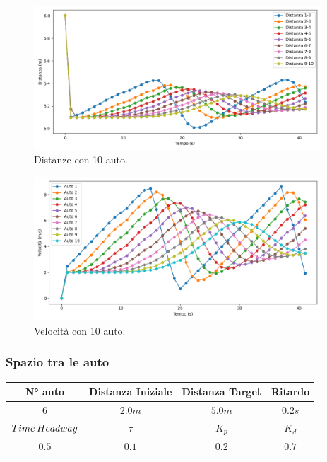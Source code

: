 \begin{figure}[H]
    \includegraphics[width=0.96\textwidth]{images/5-experiment/car-number/distance_10.png}
    \caption{Distanze con 10 auto.}
    \label{fig:10-cars-distance}
\end{figure}

\begin{figure}[H]
    \includegraphics[width=0.96\textwidth]{images/5-experiment/car-number/velocity_10.png}
    \caption{Velocità con 10 auto.}
    \label{fig:10-cars-velocity}
\end{figure}

\vspace*{\fill}
\newpage


\subsubsection{Spazio tra le auto}
\vspace*{\fill}
\begin{table}[h]
    \centering
    \begin{tabular}{|c|c|c|c|}
        \hline
        N° auto & Distanza Iniziale & Distanza Target & Ritardo \\
        \hline
        $6$ & $2.0 m$ & $5.0 m$ & $0.2 s$ \\
        \hline
        $Time\hspace{0.2em}Headway$ & $\tau$ & $K_p$ & $K_d$  \\
        \hline
        $0.5$ & $0.1$ & $0.2$ & $0.7$ \\
        \hline
    \end{tabular}
\end{table}

